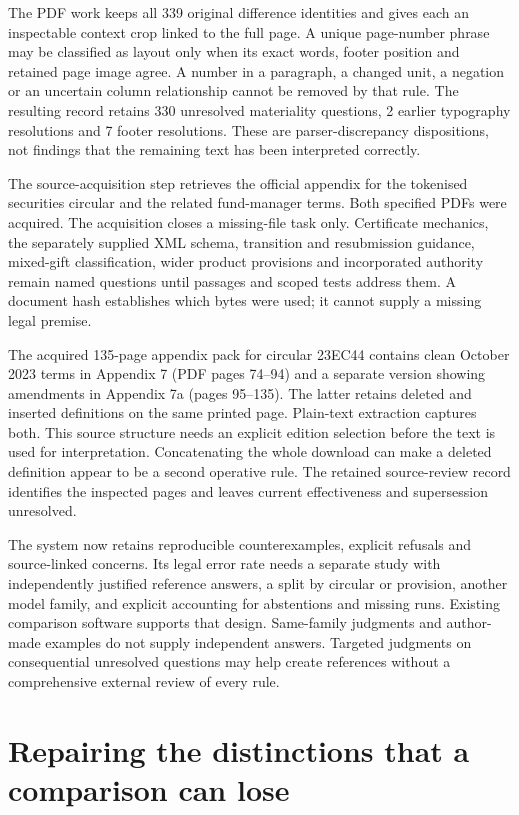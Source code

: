 \documentclass[12pt,a4paper,oneside,openany]{book}
\begin{document}
The PDF work keeps all 339 original difference identities and gives each an
inspectable context crop linked to the full page. A unique page-number phrase
may be classified as layout only when its exact words, footer position and
retained page image agree. A number in a paragraph, a changed unit, a negation or
an uncertain column relationship cannot be removed by that rule. The resulting record retains 330 unresolved materiality questions, 2 earlier typography resolutions and 7 footer resolutions.
These are parser-discrepancy dispositions, not findings that the remaining text
has been interpreted correctly.

The source-acquisition step retrieves the official appendix for the tokenised
securities circular and the related fund-manager terms. Both specified PDFs were acquired.
The acquisition closes a missing-file task only. Certificate mechanics, the
separately supplied XML schema, transition and resubmission guidance, mixed-gift
classification, wider product provisions and incorporated authority remain
named questions until passages and scoped tests address them. A document hash
establishes which bytes were used; it cannot supply a missing legal premise.

The acquired 135-page appendix pack for circular 23EC44 contains clean October
2023 terms in Appendix 7 (PDF pages 74--94) and a separate version showing
amendments in Appendix 7a (pages 95--135). The latter retains deleted and inserted definitions on the same
printed page. Plain-text extraction captures both. This source structure needs
an explicit edition selection before the text is used for interpretation.
Concatenating the whole download can make a deleted definition appear to be a
second operative rule. The retained source-review record identifies the inspected
pages and leaves current effectiveness and supersession unresolved.

The system now retains reproducible counterexamples, explicit refusals and
source-linked concerns. Its legal error rate needs a separate study with
independently justified reference answers, a split by circular or provision,
another model family, and explicit accounting for abstentions and missing runs.
Existing comparison software supports that design. Same-family judgments and
author-made examples do not supply independent answers. Targeted judgments on
consequential unresolved questions may help create references without a
comprehensive external review of every rule.


\section{Repairing the distinctions that a comparison can lose}
\label{sec:input-meaning-repair}
\end{document}
